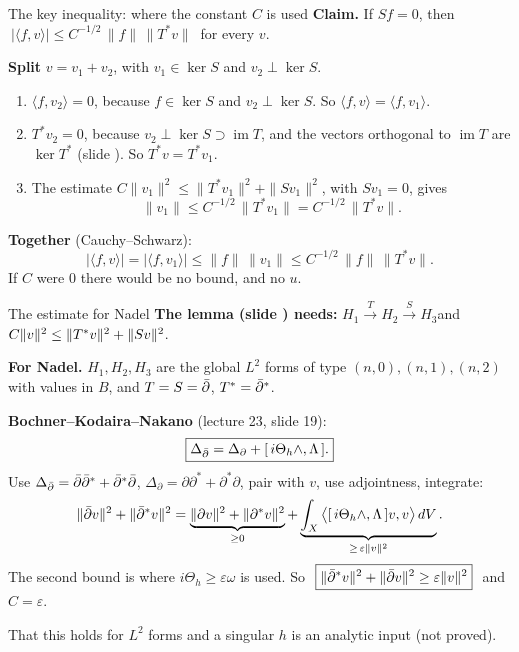 \begin{frame}{The key inequality: where the constant \(C\) is used}
\label{fr:hilbert-key}
\textbf{Claim.} If \(Sf=0\), then \(\ |\langle f,v\rangle|\le C^{-1/2}\,\|f\|\,\|T^*v\|\ \) for every \(v\).
\par\medskip
\textbf{Split} \(v=v_1+v_2\), with \(v_1\in\ker S\) and \(v_2\perp\ker S\).
\begin{enumerate}
\setlength{\itemsep}{6pt}
\item \(\langle f,v_2\rangle=0\), because \(f\in\ker S\) and \(v_2\perp\ker S\). So \(\langle f,v\rangle=\langle f,v_1\rangle\).
\item \(T^*v_2=0\), because \(v_2\perp\ker S\supset\operatorname{im}T\), and the vectors orthogonal to \(\operatorname{im}T\) are \(\ker T^*\) (slide \hyperlink{fr:linalg-adjoint}{\pageref{fr:linalg-adjoint}}). So \(T^*v=T^*v_1\).
\item The estimate \(C\|v_1\|^2\le\|T^*v_1\|^2+\|Sv_1\|^2\), with \(Sv_1=0\), gives
\[
\|v_1\|\le C^{-1/2}\,\|T^*v_1\|=C^{-1/2}\,\|T^*v\| .
\]
\end{enumerate}
\textbf{Together} (Cauchy--Schwarz):
\[
|\langle f,v\rangle|=|\langle f,v_1\rangle|\le\|f\|\,\|v_1\|\le C^{-1/2}\,\|f\|\,\|T^*v\| .
\]
If \(C\) were \(0\) there would be no bound, and no \(u\).
\src{\textcolor{red}{I did not verify this slide.}}
\end{frame}



\begin{frame}{The estimate for Nadel}
\label{fr:nadel-estimate}
\textbf{The lemma (slide \hyperlink{fr:hilbert-lemma}{\pageref{fr:hilbert-lemma}}) needs:}\quad
\(H_1\xrightarrow{T}H_2\xrightarrow{S}H_3\)\quad and\quad \(C\lVert v\rVert^2\le\lVert T^*v\rVert^2+\lVert Sv\rVert^2\).
\par\smallskip
\textbf{For Nadel.} \(H_1,H_2,H_3\) are the global \(L^2\) forms of type \((n,0),(n,1),(n,2)\) with values in \(B\), and \(T=S=\bar\partial\), \(T^*=\bar\partial^*\).
\par\smallskip
\textbf{Bochner--Kodaira--Nakano} (lecture 23, slide 19):
\[
\boxed{\Delta_{\bar\partial}=\Delta_{\partial}+[\,i\Theta_h\wedge,\Lambda\,].}
\]
Use \(\Delta_{\bar\partial}=\bar\partial\bar\partial^*+\bar\partial^*\bar\partial\), \(\Delta_{\partial}=\partial\partial^*+\partial^*\partial\), pair with \(v\), use adjointness, integrate:
\[
\lVert\bar\partial v\rVert^2+\lVert\bar\partial^*v\rVert^2
=\underbrace{\lVert\partial v\rVert^2+\lVert\partial^*v\rVert^2}_{\ge0}
+\underbrace{\int_X\big\langle[\,i\Theta_h\wedge,\Lambda\,]v,v\big\rangle\,dV}_{\ge\,\varepsilon\lVert v\rVert^2}.
\]
The second bound is where \(i\Theta_h\ge\varepsilon\omega\) is used. So \(\ \boxed{\norm{\db^*v}^2+\norm{\db v}^2\ge\varepsilon\norm{v}^2}\ \) and \(C=\varepsilon\).
\par
That this holds for \(L^2\) forms and a singular \(h\) is an analytic input (not proved).
\end{frame}

